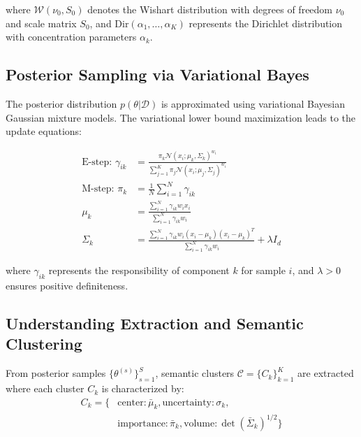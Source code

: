 where $\mathcal{W}(\nu_0, S_0)$ denotes the Wishart distribution with degrees of freedom $\nu_0$ and scale matrix $S_0$, and $\text{Dir}(\alpha_1, \ldots, \alpha_K)$ represents the Dirichlet distribution with concentration parameters $\alpha_k$.

\subsection{Posterior Sampling via Variational Bayes}

The posterior distribution $p(\theta|\mathcal{D})$ is approximated using variational Bayesian Gaussian mixture models. The variational lower bound maximization leads to the update equations:

\begin{align}
\text{E-step: } \gamma_{ik} &= \frac{\pi_k \mathcal{N}(x_i; \mu_k, \Sigma_k)^{w_i}}{\sum_{j=1}^K \pi_j \mathcal{N}(x_i; \mu_j, \Sigma_j)^{w_i}} \label{eq:responsibility}\\
\text{M-step: } \pi_k &= \frac{1}{N} \sum_{i=1}^N \gamma_{ik} \label{eq:mixture-update}\\
\mu_k &= \frac{\sum_{i=1}^N \gamma_{ik} w_i x_i}{\sum_{i=1}^N \gamma_{ik} w_i} \label{eq:mean-update}\\
\Sigma_k &= \frac{\sum_{i=1}^N \gamma_{ik} w_i (x_i - \mu_k)(x_i - \mu_k)^T}{\sum_{i=1}^N \gamma_{ik} w_i} + \lambda I_d \label{eq:covariance-update}
\end{align}

where $\gamma_{ik}$ represents the responsibility of component $k$ for sample $i$, and $\lambda > 0$ ensures positive definiteness.

\subsection{Understanding Extraction and Semantic Clustering}

\begin{definition}
From posterior samples $\{\theta^{(s)}\}_{s=1}^S$, semantic clusters $\mathcal{C} = \{C_k\}_{k=1}^K$ are extracted where each cluster $C_k$ is characterized by:
\begin{align}
C_k = \{&\text{center}: \bar{\mu}_k, \text{uncertainty}: \sigma_k, \\
&\text{importance}: \bar{\pi}_k, \text{volume}: \det(\bar{\Sigma}_k)^{1/2}\}
\end{align}
\end{definition}

